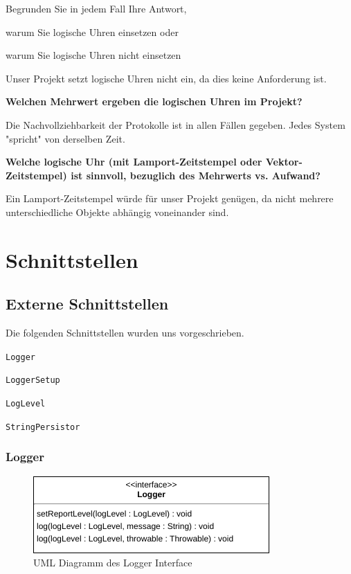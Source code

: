 \documentclass[12pt,a4paper,twosided]{scrartcl}
\newenvironment{tight_enumerate}{
\begin{enumerate}
	\setlength{\itemsep}{0pt}
	\setlength{\parskip}{0pt}
}{\end{enumerate}}
\begin{document}
\begin{tight_enumerate}
	\item Begrunden Sie in jedem Fall Ihre Antwort,
	\item warum Sie logische Uhren einsetzen oder
	\item warum Sie logische Uhren nicht einsetzen
\end{tight_enumerate}

Unser Projekt setzt logische Uhren nicht ein, da dies keine Anforderung ist.

\textbf{Welchen Mehrwert ergeben die logischen Uhren im Projekt?}

Die Nachvollziehbarkeit der Protokolle ist in allen Fällen gegeben. Jedes System "spricht" von derselben Zeit.

\textbf{Welche logische Uhr (mit Lamport-Zeitstempel oder Vektor-Zeitstempel) ist sinnvoll, bezuglich des Mehrwerts vs. Aufwand?}

Ein Lamport-Zeitstempel würde für unser Projekt genügen, da nicht mehrere unterschiedliche Objekte abhängig voneinander sind.

\newpage

\section{Schnittstellen}
\subsection{Externe Schnittstellen}
Die folgenden Schnittstellen wurden uns vorgeschrieben.

\begin{tight_enumerate}
	\item \texttt{Logger}
	\item \texttt{LoggerSetup}
	\item \texttt{LogLevel}
	\item \texttt{StringPersistor}
\end{tight_enumerate}

\subsubsection{Logger}
\begin{figure}[h]
	\centering
	\includegraphics[width=0.5\linewidth]{img/LoggerInterface}
	\caption{UML Diagramm des Logger Interface}
	\label{fig:loggerinterface}
\end{figure}
\end{document}
